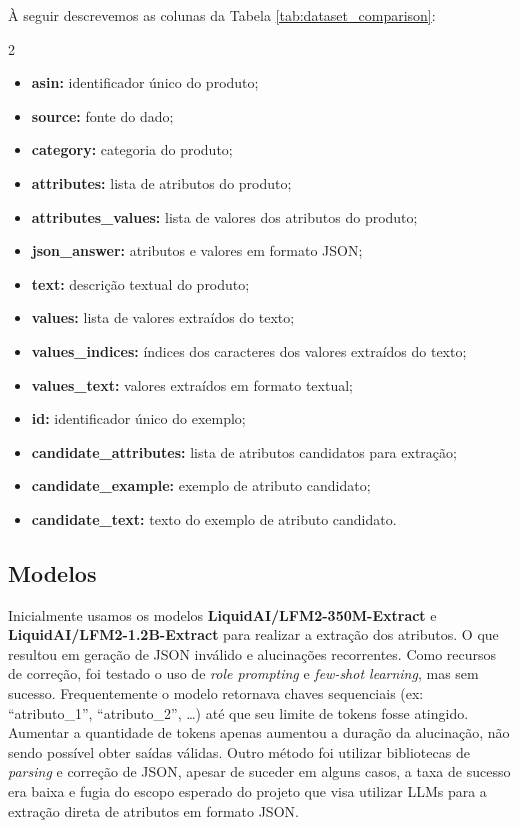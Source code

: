 À seguir descrevemos as colunas da Tabela \ref{tab:dataset_comparison}:

\begin{multicols}{2}
  \begin{itemize}
    \item \textbf{asin:} identificador único do produto;
    \item \textbf{source:} fonte do dado;
    \item \textbf{category:} categoria do produto;
    \item \textbf{attributes:} lista de atributos do produto;
    \item \textbf{attributes\_values:} lista de valores dos atributos do produto;
    \item \textbf{json\_answer:} atributos e valores em formato JSON;
    \item \textbf{text:} descrição textual do produto;
    \item \textbf{values:} lista de valores extraídos do texto;
    \item \textbf{values\_indices:} índices dos caracteres dos valores extraídos do texto;
    \item \textbf{values\_text:} valores extraídos em formato textual;
    \item \textbf{id:} identificador único do exemplo;
    \item \textbf{candidate\_attributes:} lista de atributos candidatos para extração;
    \item \textbf{candidate\_example:} exemplo de atributo candidato;
    \item \textbf{candidate\_text:} texto do exemplo de atributo candidato.
  \end{itemize}
\end{multicols}

\subsection{Modelos}

Inicialmente usamos os modelos \textbf{LiquidAI/LFM2-350M-Extract} e \textbf{LiquidAI/LFM2-1.2B-Extract} para realizar a extração dos atributos. O que resultou em geração de JSON inválido e alucinações recorrentes. Como recursos de correção, foi testado o uso de \textit{role prompting} e \textit{few-shot learning}, mas sem sucesso. Frequentemente o modelo retornava chaves sequenciais (ex: ``atributo\_1'', ``atributo\_2'', \dots) até que seu limite de tokens fosse atingido. Aumentar a quantidade de tokens apenas aumentou a duração da alucinação, não sendo possível obter saídas válidas. Outro método foi utilizar bibliotecas de \textit{parsing} e correção de JSON, apesar de suceder em alguns casos, a taxa de sucesso era baixa e fugia do escopo esperado do projeto que visa utilizar LLMs para a extração direta de atributos em formato JSON.

